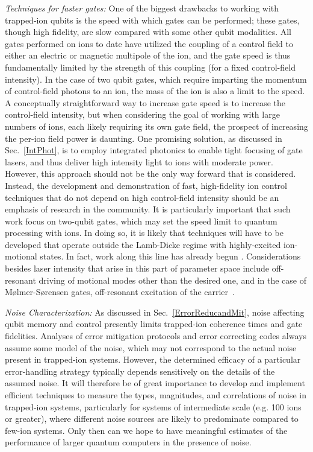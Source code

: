 \documentclass[%
12pt,
 amsmath,amssymb,
]{revtex4-2}
\begin{document}
\textit{Techniques for faster gates:} One of the biggest drawbacks to working with trapped-ion qubits is the speed with which gates can be performed; these gates, though high fidelity, are slow compared with some other qubit modalities.  All gates performed on ions to date have utilized the coupling of a control field to either an electric or magnetic multipole of the ion, and the gate speed is thus fundamentally limited by the strength of this coupling (for a fixed control-field intensity).  In the case of two qubit gates, which require imparting the momentum of control-field photons to an ion, the mass of the ion is also a limit to the speed.  A conceptually straightforward way to increase gate speed is to increase the control-field intensity, but when considering the goal of working with large numbers of ions, each likely requiring its own gate field, the prospect of increasing the per-ion field power is daunting.  One promising solution, as discussed in Sec.~\ref{IntPhot}, is to employ integrated photonics to enable tight focusing of gate lasers, and thus deliver high intensity light to ions with moderate power.  However, this approach should not be the only way forward that is considered.  Instead, the development and demonstration of fast, high-fidelity ion control techniques that do not depend on high control-field intensity should be an emphasis of research in the community.  It is particularly important that such work focus on two-qubit gates, which may set the speed limit to quantum processing with ions.  In doing so, it is likely that techniques will have to be developed that operate outside the Lamb-Dicke regime with highly-excited ion-motional states. In fact, work along this line has already begun \cite{SchaferFastIonGates2018}.  Considerations besides laser intensity that arise in this part of parameter space include off-resonant driving of motional modes other than the desired one, and in the case of M{\o}lmer-S{\o}rensen gates, off-resonant excitation of the carrier~\cite{SteanePulseGates2014}.

\textit{Noise Characterization:} As discussed in Sec.~\ref{ErrorReducandMit}, noise affecting qubit memory and control presently limits trapped-ion coherence times and gate fidelities.  Analyses of error mitigation protocols and error correcting codes always assume some model of the noise, which may not correspond to the actual noise present in trapped-ion systems.  However, the determined efficacy of a particular error-handling strategy typically depends sensitively on the details of the assumed noise.  It will therefore be of great importance to develop and implement efficient techniques to measure the types, magnitudes, and correlations of noise in trapped-ion systems, particularly for systems of intermediate scale (e.g. 100 ions or greater), where different noise sources are likely to predominate compared to few-ion systems.  Only then can we hope to have meaningful estimates of the performance of larger quantum computers in the presence of noise.
\end{document}

